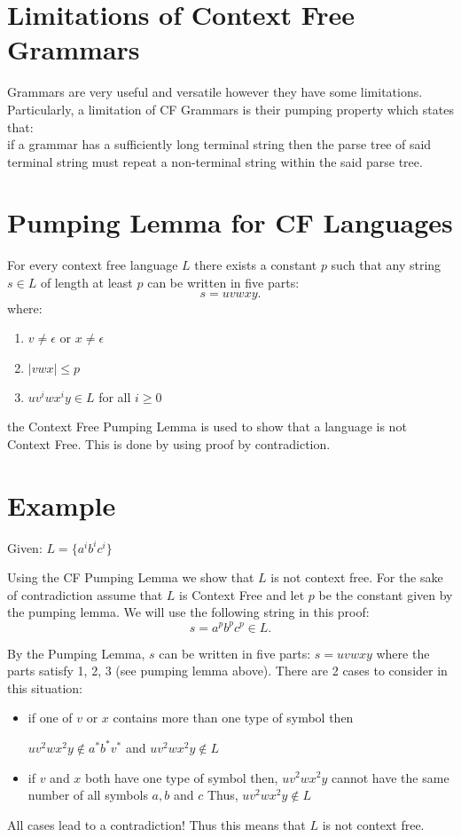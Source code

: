 \documentclass[12pt]{book}
\title{\coursetitle\linebreak\lecturename}
\author{\\Cain Susko\\ 
           \\ \\ \\
      Queen's University 
    \\School of Computing\\}
\begin{document}
\begin{titlepage}
        \maketitle
\end{titlepage}


\section*{Limitations of Context Free Grammars}
Grammars are very useful and versatile however they have some limitations.
Particularly, a limitation of CF Grammars is their pumping property which states that:\\
if a grammar has a sufficiently long terminal string then the parse tree of said terminal string must
        repeat a non-terminal string within the said parse tree.

\section*{Pumping Lemma for CF Languages}
For every context free language  $L$ there exists a constant  $p$ such that any string $s\in L$ of length at least  $p$
can be written in five parts:
 \[
s = uvwxy
.\] 
where:
\begin{enumerate}
        \item $v\neq\epsilon$ or  $x\neq \epsilon$ 
        \item $|vwx|\leq p$
        \item  $uv^i wx^i y\in L$ for all  $i\geq 0$
\end{enumerate}
the Context Free Pumping Lemma is used to show that a language is not Context Free. This is done by using proof by contradiction.

\section*{Example}
Given: $L = \{a^i b^i c^i\}$

Using the CF Pumping Lemma we show that $L$ is not context free.
For the sake of contradiction assume that  $L$ is Context Free and let  $p$ be the constant given by the pumping lemma.
We will use the following string in this proof:
 \[
s = a^p b^p c^p \in L
.\] 
\pagebreak


By the Pumping Lemma, $s$ can be written in five parts:  $s = uvwxy$ where the parts satisfy 1, 2, 3 (see pumping lemma above).
There are 2 cases to consider in this situation:
 \begin{itemize}
        \item if one of $v$ or  $x$ contains more than one type of symbol then  

        $uv^2wx^2y\not\in a^\text{*} b^\text{*} v^\text{*}$ and $uv^2wx^2y\not\in L$ 
        \item if $v$ and  $x$ both have one type of symbol then,
        $uv^2wx^2y$ cannot have the same number of all symbols  $a,b$ and  $c$
        Thus, $uv^2wx^2y \not\in L$
\end{itemize}
All cases lead to a contradiction! Thus this means that $L$ is not context free.
\end{document}
